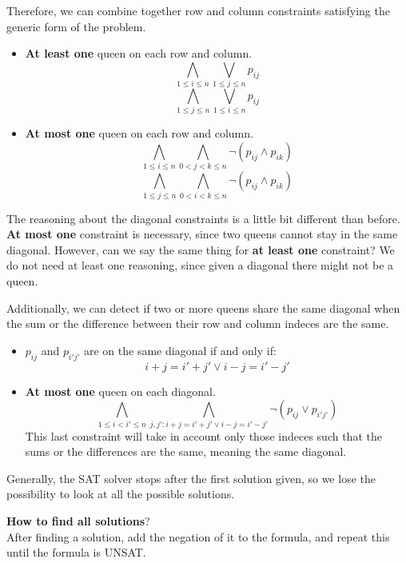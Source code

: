 \begin{example}
    Therefore, we can combine together row and column constraints satisfying the generic form of the problem.
    \begin{itemize}
        \renewcommand{\labelitemi}{-}
        \item \textbf{At least one} queen on each row and column.
        $$ \bigwedge_{1 \leq i \leq n} \bigvee_{1 \leq j \leq n} p_{ij} $$
        $$ \bigwedge_{1 \leq j \leq n} \bigvee_{1 \leq i \leq n} p_{ij} $$
        \item \textbf{At most one} queen on each row and column.
        $$ \bigwedge_{1 \leq i \leq n} \bigwedge_{0 < j < k \leq n} \neg (p_{ij} \wedge p_{ik}) $$
        $$ \bigwedge_{1 \leq j \leq n} \bigwedge_{0 < i < k \leq n} \neg (p_{ij} \wedge p_{ik}) $$
    \end{itemize} \vspace{7pt}

    The reasoning about the diagonal constraints is a little bit different than before. \textbf{At most one} constraint is necessary, since two queens cannot 
    stay in the same diagonal. However, can we say the same thing for \textbf{at least one} constraint? We do not need at least one reasoning, since given a 
    diagonal there might not be a queen. \vspace{7pt}

    Additionally, we can detect if two or more queens share the same diagonal when the sum or the difference between their row and column indeces are the same.
    \begin{itemize}
        \renewcommand{\labelitemi}{-}
        \item $p_{ij}$ and $p_{i'j'}$ are on the same diagonal if and only if:
        $$ i + j = i' + j' \vee i - j = i' - j' $$
        \item \textbf{At most one} queen on each diagonal. 
        $$ \bigwedge_{1 \leq i < i' \leq n} \bigwedge_{j, j': i + j = i' + j' \vee i - j = i' - j'} \neg (p_{ij} \vee p_{i'j'}) $$
        This last constraint will take in account only those indeces such that the sums or the differences are the same, meaning the same diagonal.
    \end{itemize}
\end{example}
Generally, the SAT solver stops after the first solution given, so we lose the possibility to look at all the possible solutions. \vspace{7pt}

\textbf{How to find all solutions}? \\ 
After finding a solution, add the negation of it to the formula, and repeat this until the formula is UNSAT.
